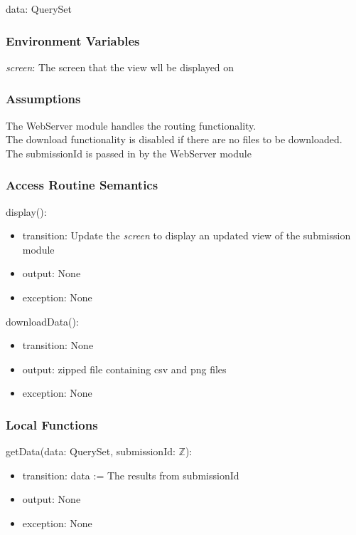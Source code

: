 \documentclass[12pt, titlepage]{article}
\begin{document}
data: QuerySet

\subsubsection{Environment Variables}

\textit{screen}: The screen that the view wll be displayed on

\subsubsection{Assumptions}

The WebServer module handles the routing functionality. \\
The download functionality is disabled if there are no files to be downloaded. \\
The submissionId is passed in by the WebServer module

\subsubsection{Access Routine Semantics}

\noindent display():
\begin{itemize}
\item transition: Update the \textit{screen} to display an updated view of the submission module
\item output: None
\item exception: None
\end{itemize}

\noindent downloadData():
\begin{itemize}
\item transition: None
\item output: zipped file containing csv and png files
\item exception: None
\end{itemize}

\subsubsection{Local Functions}

\noindent getData(data: QuerySet, submissionId: $\mathbb{Z}$):
\begin{itemize}
\item transition: data := The results from submissionId
\item output: None
\item exception: None
\end{itemize}
\end{document}

